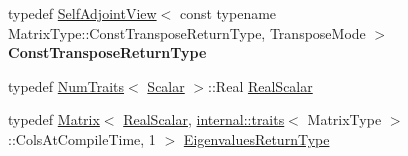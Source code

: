 \begin{DoxyCompactItemize}
\item 
\mbox{\label{class_eigen_1_1_self_adjoint_view_a7fb31929335c590a2599c2c6b90e9c64}} 
typedef \mbox{\hyperlink{class_eigen_1_1_self_adjoint_view}{Self\+Adjoint\+View}}$<$ const typename Matrix\+Type\+::\+Const\+Transpose\+Return\+Type, Transpose\+Mode $>$ {\bfseries Const\+Transpose\+Return\+Type}
\item 
typedef \mbox{\hyperlink{struct_eigen_1_1_num_traits}{Num\+Traits}}$<$ \mbox{\hyperlink{class_eigen_1_1_self_adjoint_view_af52acc0942ece2de9b6db4a99cc6656e}{Scalar}} $>$\+::Real \mbox{\hyperlink{class_eigen_1_1_self_adjoint_view_af9f0234ebeae4c4ca512bcd5fb5e8bb1}{Real\+Scalar}}
\item 
typedef \mbox{\hyperlink{class_eigen_1_1_matrix}{Matrix}}$<$ \mbox{\hyperlink{class_eigen_1_1_self_adjoint_view_af9f0234ebeae4c4ca512bcd5fb5e8bb1}{Real\+Scalar}}, \mbox{\hyperlink{struct_eigen_1_1internal_1_1traits}{internal\+::traits}}$<$ Matrix\+Type $>$\+::Cols\+At\+Compile\+Time, 1 $>$ \mbox{\hyperlink{class_eigen_1_1_self_adjoint_view_a8ae92703d920130b38a383f8b165146c}{Eigenvalues\+Return\+Type}}
\end{DoxyCompactItemize}
